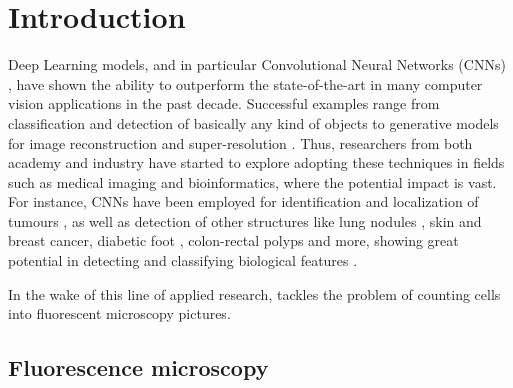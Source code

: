 \chapter{Introduction}
\label{chap:partI_intro}

Deep Learning models, and in particular Convolutional Neural Networks (CNNs) \cite{jimenez, greenspan}, have shown the ability to outperform the state-of-the-art in many computer vision applications in the past decade. 
Successful examples range from classification and detection of basically any kind of objects \cite{AlexNet, YOLO} to generative models for image reconstruction \cite{reconstruction} and super-resolution \cite{super-resolution}.
Thus, researchers from both academy and industry have started to explore adopting these techniques in fields such as medical imaging and bioinformatics, where the potential impact is vast.
For instance, CNNs have been employed for identification and localization of tumours \cite{brain_tumor,breast_cancer, ciresan2012deep, cirecsan2013mitosis}, as well as detection of other structures like lung nodules \cite{lung_nodules, meraj2020lung, su2021lung}, skin and breast cancer, diabetic foot \cite{TL_medical_imaging}, colon-rectal polyps \cite{korbar} and more, showing great potential in detecting and classifying biological features \cite{lundervold, sahiner, yadav}.

In the wake of this line of applied research,  tackles the problem of counting cells into fluorescent microscopy pictures.

\section{Fluorescence microscopy 
}
\label{sec:fluorescence_microscopy}

